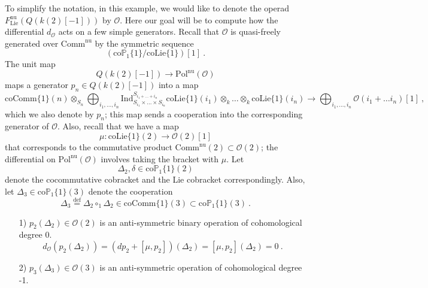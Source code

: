 \documentclass[10pt, oneside]{amsart}
\theoremstyle{plain}
\newcommand{\comm}{\mathrm{Comm}}
\newcommand{\ccomm}{\mathrm{coComm}}
\newcommand{\colie}{\mathrm{coLie}}
\newcommand{\define}{\text{def}}
\newcommand{\lie}{\mathrm{Lie}}
\renewcommand{\nu}{\mathrm{nu}}
\renewcommand{\O}{\mathcal{O}}
\newcommand{\PP}{\mathbb{P}}
\newcommand{\pol}{\mathrm{Pol}}
\newcommand{\coP}{\mathrm{co}\PP}
\begin{document}
\begin{example}\label{computation1}
To simplify the notation, in this example, we would like to denote the operad $F^\nu_\lie(Q(k(2)[-1]))$ by $\O$. Here our goal will
be to compute how the differential $d_\O$ acts on a few simple generators. Recall that $\O$ is quasi-freely generated over $\comm^\nu$ 
by the symmetric sequence
\begin{equation*}
\left( \coP_1\{1\} / \colie\{1\} \right) [1] \:.
\end{equation*}
The unit map
\begin{equation*}
Q(k(2)[-1]) \longrightarrow \pol^\nu(\O)
\end{equation*}
maps a generator $p_n \in Q(k(2)[-1])$ into a map
\begin{equation*}
\ccomm\{1\}(n) \otimes_{S_n} \bigoplus_{i_1, \ldots, i_n} \mathrm{Ind}^{S_{i_1 + \ldots + i_n}}_{S_{i_1} \times \ldots \times S_{i_n}} \colie\{1\}(i_1) \otimes_k \ldots \otimes_k \colie\{1\}(i_n) \longrightarrow \bigoplus_{i_1, \ldots, i_n}\O(i_1 + \ldots i_n)[1] \:,
\end{equation*}
which we also denote by $p_n$; this map sends a cooperation into the corresponding generator of $\O$. Also, recall that we have a map
\begin{equation*}
\mu \colon \colie\{1\}(2) \longrightarrow \O(2)[1]
\end{equation*}
that corresponds to the commutative product $\comm^\nu(2) \subset \O(2)$; the differential on $\pol^\nu(\O)$ involves taking the bracket
with $\mu$.
Let
\begin{equation*}
\Delta_2, \delta \in \coP_1\{1\}(2)
\end{equation*}
denote the cocommutative cobracket and the Lie cobracket correspondingly. Also, let $\Delta_3 \in \coP_1\{1\}(3)$ denote the cooperation
\begin{equation*}
\Delta_3 \stackrel{\define}{=} \Delta_2 \circ_1 \Delta_2 \in \ccomm\{1\}(3) \subset \coP_1\{1\}(3) \:.
\end{equation*}
\begin{enumerate}
\item [1)] $p_2(\Delta_2) \in \O(2)$ is an anti-symmetric binary operation of cohomological degree 0.
\begin{equation*}
d_\O (p_2(\Delta_2)) = (dp_2 + [\mu, p_2]) (\Delta_2) = [\mu, p_2] (\Delta_2) = 0 \:.
\end{equation*}
\item[2)] $p_3(\Delta_3) \in \O(3)$ is an anti-symmetric operation of cohomological degree -1.

\end{enumerate}
\end{example}
\end{document}
